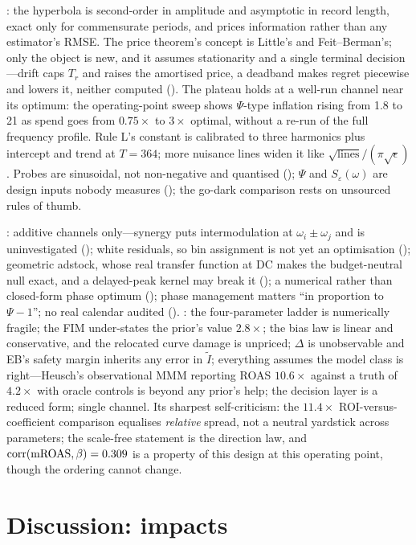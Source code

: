: the hyperbola is second-order in amplitude and asymptotic in record length, exact only for commensurate periods, and prices information rather than any estimator's RMSE. The price theorem's concept is Little's and Feit--Berman's; only the object is new, and it assumes stationarity and a single terminal decision---drift caps $T_r$ and raises the amortised price, a deadband makes regret piecewise and lowers it, neither computed (). The plateau holds at a well-run channel near its optimum: the operating-point sweep shows $\Psi$-type inflation rising from 1.8 to 21 as spend goes from $0.75\times$ to $3\times$ optimal, without a re-run of the full frequency profile. Rule L's constant is calibrated to three harmonics plus intercept and trend at $T = 364$; more nuisance lines widen it like $\sqrt{\text{lines}}/(\pi\sqrt\epsilon)$. Probes are sinusoidal, not non-negative and quantised (); $\Psi$ and $S_\varepsilon(\omega)$ are design inputs nobody measures (); the go-dark comparison rests on unsourced rules of thumb.

: additive channels only---synergy puts intermodulation at $\omega_i \pm \omega_j$ and is uninvestigated (); white residuals, so bin assignment is not yet an optimisation (); geometric adstock, whose real transfer function at DC makes the budget-neutral null exact, and a delayed-peak kernel may break it (); a numerical rather than closed-form phase optimum (); phase management matters ``in proportion to $\Psi - 1$''; no real calendar audited (). : the four-parameter ladder is numerically fragile; the FIM under-states the prior's value $2.8\times$; the bias law is linear and conservative, and the relocated curve damage is unpriced; $\Delta$ is unobservable and EB's safety margin inherits any error in $\tilde I$; everything assumes the model class is right---Heusch's observational MMM reporting ROAS $10.6\times$ against a truth of $4.2\times$ with oracle controls is beyond any prior's help; the decision layer is a reduced form; single channel. Its sharpest self-criticism: the $11.4\times$ ROI-versus-coefficient comparison equalises \emph{relative} spread, not a neutral yardstick across parameters; the scale-free statement is the direction law, and $\mathrm{corr}(\mathrm{mROAS}, \beta) = 0.309$ is a property of this design at this operating point, though the ordering cannot change.

\section{Discussion: impacts}

